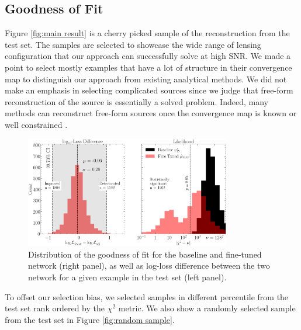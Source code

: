 \subsection{Goodness of Fit}
Figure \ref{fig:main result} is a cherry picked sample of the reconstruction from the test set. 
The samples are selected to showcase the wide range of lensing configuration that 
our approach can successfully solve at high SNR. We made a point to select mostly 
examples that have a lot of structure in their convergence map to distinguish 
our approach from existing analytical methods. We did not make an 
emphasis in selecting complicated sources since we judge that 
free-form reconstruction of the source is essentially a solved problem. 
Indeed, many methods can reconstruct free-form sources 
once the convergence map is known or well constrained 
\citep{Warren2003,Suyu2006,Vegetti2009,Birrer2018,Morningstar2019,Galan2021,Karchev2022,Mishra-Sharma2022}.

\begin{figure}[H]
        \centering
        \includegraphics[width=0.8\textwidth]{figures/loss_and_likelihood}
        \caption{Distribution of the goodness of fit for the baseline and fine-tuned network (right panel), as well as log-loss difference between the two network for a given example in the test set (left panel).
}
        \label{fig:loss and chi squared}
\end{figure}


To offset our selection bias, we selected samples in different percentile from the
test set rank ordered by the $\chi^2$ metric. 
We also show a randomly selected sample from the test set in Figure \ref{fig:random sample}.

